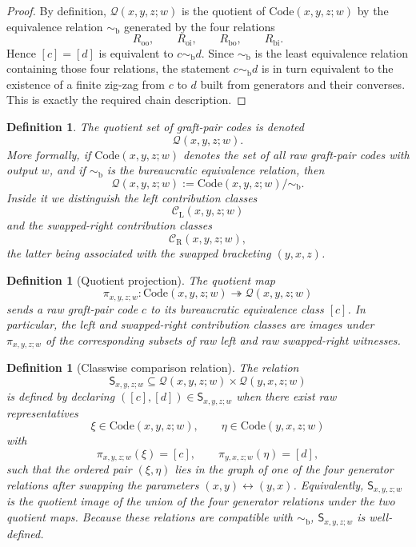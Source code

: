 \documentclass[11pt]{article}
\newtheorem{definition}[theorem]{Definition}
\newcommand{\Qclass}{\mathcal{Q}}
\newcommand{\CL}{\mathcal{C}_{\mathrm{L}}}
\newcommand{\CR}{\mathcal{C}_{\mathrm{R}}}
\newcommand{\Swap}{\mathsf{S}}
\begin{document}
\begin{proof}
By definition, \(\Qclass(x,y,z;w)\) is the quotient of
\(\mathrm{Code}(x,y,z;w)\) by the equivalence relation \(\sim_{\mathrm b}\)
generated by the four relations
\[
R_{\mathrm{oo}},\qquad
R_{\mathrm{oi}},\qquad
R_{\mathrm{bo}},\qquad
R_{\mathrm{bi}}.
\]
Hence
\([c]=[d]\) is equivalent to \(c\sim_{\mathrm b} d\). Since
\(\sim_{\mathrm b}\) is the least equivalence relation containing those
four relations, the statement \(c\sim_{\mathrm b} d\) is in turn equivalent
to the existence of a finite zig-zag from \(c\) to \(d\) built from generators
and their converses. This is exactly the required chain description.
\end{proof}

\begin{definition}
The quotient set of graft-pair codes is denoted
\[
\Qclass(x,y,z;w).
\]
More formally, if \(\mathrm{Code}(x,y,z;w)\) denotes the set of all raw
graft-pair codes with output \(w\), and if \(\sim_{\mathrm{b}}\) is the
bureaucratic equivalence relation, then
\[
\Qclass(x,y,z;w):=\mathrm{Code}(x,y,z;w)/{\sim_{\mathrm{b}}}.
\]
Inside it we distinguish the left contribution classes
\[
\CL(x,y,z;w)
\]
and the swapped-right contribution classes
\[
\CR(x,y,z;w),
\]
the latter being associated with the swapped bracketing \((y,x,z)\).
\end{definition}

\begin{definition}[Quotient projection]
The quotient map
\[
\pi_{x,y,z;w} :
\mathrm{Code}(x,y,z;w)
\twoheadrightarrow
\Qclass(x,y,z;w)
\]
sends a raw graft-pair code \(c\) to its bureaucratic equivalence class
\([c]\). In particular, the left and swapped-right contribution classes are
images under \(\pi_{x,y,z;w}\) of the corresponding subsets of raw left and raw
swapped-right witnesses.
\end{definition}

\begin{definition}[Classwise comparison relation]
The relation
\[
\Swap_{x,y,z;w}\subseteq \Qclass(x,y,z;w)\times \Qclass(y,x,z;w)
\]
is defined by declaring \(([c],[d])\in \Swap_{x,y,z;w}\) when there exist raw
representatives
\[
\xi\in \mathrm{Code}(x,y,z;w),
\qquad
\eta\in \mathrm{Code}(y,x,z;w)
\]
with
\[
\pi_{x,y,z;w}(\xi)=[c],
\qquad
\pi_{y,x,z;w}(\eta)=[d],
\]
such that the ordered pair \((\xi,\eta)\) lies in the graph of one of the four
generator relations after swapping the parameters \((x,y)\leftrightarrow(y,x)\).
Equivalently, \(\Swap_{x,y,z;w}\) is the quotient image of the union of the
four generator relations under the two quotient maps. Because these relations
are compatible with \(\sim_{\mathrm b}\), \(\Swap_{x,y,z;w}\) is well-defined.
\end{definition}
\end{document}
